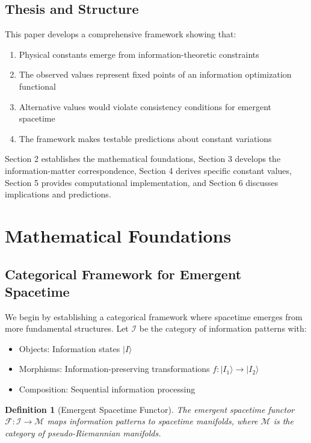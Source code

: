 \documentclass[12pt,a4paper]{article}
\newtheorem{definition}[theorem]{Definition}
\begin{document}
\subsection{Thesis and Structure}

This paper develops a comprehensive framework showing that:
\begin{enumerate}
\item Physical constants emerge from information-theoretic constraints
\item The observed values represent fixed points of an information optimization functional
\item Alternative values would violate consistency conditions for emergent spacetime
\item The framework makes testable predictions about constant variations
\end{enumerate}

Section 2 establishes the mathematical foundations, Section 3 develops the information-matter correspondence, Section 4 derives specific constant values, Section 5 provides computational implementation, and Section 6 discusses implications and predictions.

\section{Mathematical Foundations}

\subsection{Categorical Framework for Emergent Spacetime}

We begin by establishing a categorical framework where spacetime emerges from more fundamental structures. Let $\mathcal{I}$ be the category of information patterns with:
\begin{itemize}
\item Objects: Information states $|I\rangle$
\item Morphisms: Information-preserving transformations $f: |I_1\rangle \to |I_2\rangle$
\item Composition: Sequential information processing
\end{itemize}

\begin{definition}[Emergent Spacetime Functor]
The emergent spacetime functor $\mathcal{F}: \mathcal{I} \to \mathcal{M}$ maps information patterns to spacetime manifolds, where $\mathcal{M}$ is the category of pseudo-Riemannian manifolds.
\end{definition}
\end{document}

